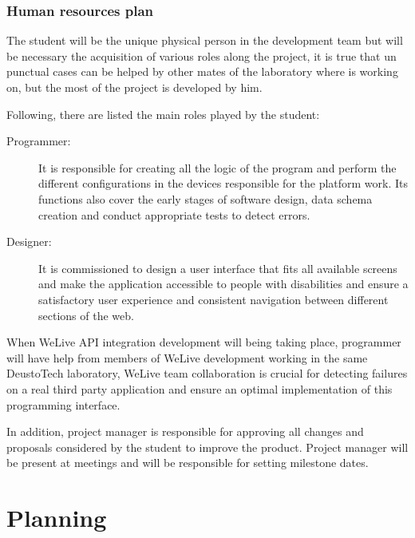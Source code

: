 \documentclass{DeustoFDP}
\begin{document}
\subsection{Human resources plan}
The student will be the unique physical person in the development team but will be necessary the acquisition of various roles along the project, it is true that un punctual cases can be helped by other mates of the laboratory where is working on, but the most of the project is developed by him.

Following, there are listed the main roles played by the student:

\begin{description}
	\item[Programmer:] It is responsible for creating all the logic of the program and perform the different configurations in the devices responsible for the platform work. Its functions also cover the early stages of software design, data schema creation and conduct appropriate tests to detect errors.
	
	\item[Designer:] It is commissioned to design a user interface that fits all available screens and make the application accessible to people with disabilities and ensure a satisfactory user experience and consistent navigation between different sections of the web.
\end{description}

When WeLive API integration development will being taking place, programmer will have help from members of WeLive development working in the same DeustoTech laboratory, WeLive team collaboration is crucial for detecting failures on a real third party application and ensure an optimal implementation of this programming interface.

In addition, project manager is responsible for approving all changes and proposals considered by the student to improve the product. Project manager will be present at meetings and will be responsible for setting milestone dates.

\chapter{Planning}\label{cha:planning}
\end{document}
